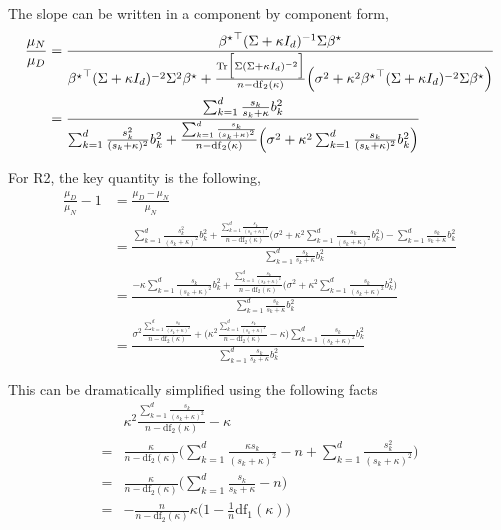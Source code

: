 The slope can be written in a component by component form,
\begin{align*}
\frac{\mu_{N}}{\mu_{D}} & =\frac{{{\beta^{\star}}}^{\top}(\Sigma+\kappa I_{d})^{-1}\Sigma{\beta^{\star}}}{{{\beta^{\star}}}^{\top}(\Sigma+\kappa I_{d})^{-2}\Sigma^{2}{\beta^{\star}}+\frac{\mathrm{Tr}\Big[\Sigma(\Sigma+\kappa I_{d})^{-2}\Big]}{n-\mathrm{df}_{2}(\kappa)}\Big(\sigma^{2}+\kappa^{2}{{\beta^{\star}}}^{\top}(\Sigma+\kappa I_{d})^{-2}\Sigma{\beta^{\star}}\Big)}\\
 & =\frac{\sum_{k=1}^{d}\frac{s_{k}}{s_{k}+\kappa}b_{k}^{2}}{\sum_{k=1}^{d}\frac{s_{k}^{2}}{(s_{k}+\kappa)^{2}}b_{k}^{2}+\frac{\sum_{k=1}^{d}\frac{s_{k}}{(s_{k}+\kappa)^{2}}}{n-\mathrm{df}_{2}(\kappa)}\Big(\sigma^{2}+\kappa^{2}\sum_{k=1}^{d}\frac{s_{k}}{(s_{k}+\kappa)^{2}}b_{k}^{2}\Big)}
\end{align*}

For R2, the key quantity is the following,
\begin{align*}
\frac{\mu_{D}}{\mu_{N}}-1 & =\frac{\mu_{D}-\mu_{N}}{\mu_{N}}\\
 & =\frac{\sum_{k=1}^{d}\frac{s_{k}^{2}}{(s_{k}+\kappa)^{2}}b_{k}^{2}+\frac{\sum_{k=1}^{d}\frac{s_{k}}{(s_{k}+\kappa)^{2}}}{n-\mathrm{df}_{2}(\kappa)}\Big(\sigma^{2}+\kappa^{2}\sum_{k=1}^{d}\frac{s_{k}}{(s_{k}+\kappa)^{2}}b_{k}^{2}\Big)-\sum_{k=1}^{d}\frac{s_{k}}{s_{k}+\kappa}b_{k}^{2}}{\sum_{k=1}^{d}\frac{s_{k}}{s_{k}+\kappa}b_{k}^{2}}\\
 & =\frac{-\kappa\sum_{k=1}^{d}\frac{s_{k}}{(s_{k}+\kappa)^{2}}b_{k}^{2}+\frac{\sum_{k=1}^{d}\frac{s_{k}}{(s_{k}+\kappa)^{2}}}{n-\mathrm{df}_{2}(\kappa)}\Big(\sigma^{2}+\kappa^{2}\sum_{k=1}^{d}\frac{s_{k}}{(s_{k}+\kappa)^{2}}b_{k}^{2}\Big)}{\sum_{k=1}^{d}\frac{s_{k}}{s_{k}+\kappa}b_{k}^{2}}\\
 & =\frac{\sigma^{2}\frac{\sum_{k=1}^{d}\frac{s_{k}}{(s_{k}+\kappa)^{2}}}{n-\mathrm{df}_{2}(\kappa)}+\Big(\kappa^{2}\frac{\sum_{k=1}^{d}\frac{s_{k}}{(s_{k}+\kappa)^{2}}}{n-\mathrm{df}_{2}(\kappa)}-\kappa\Big)\sum_{k=1}^{d}\frac{s_{k}}{(s_{k}+\kappa)^{2}}b_{k}^{2}}{\sum_{k=1}^{d}\frac{s_{k}}{s_{k}+\kappa}b_{k}^{2}}
\end{align*}

This can be dramatically simplified using the following facts
\begin{align*}
 & \kappa^{2}\frac{\sum_{k=1}^{d}\frac{s_{k}}{(s_{k}+\kappa)^{2}}}{n-\mathrm{df}_{2}(\kappa)}-\kappa\\
= & \frac{\kappa}{n-\mathrm{df}_{2}(\kappa)}\Big(\sum_{k=1}^{d}\frac{\kappa s_{k}}{(s_{k}+\kappa)^{2}}-n+\sum_{k=1}^{d}\frac{s_{k}^{2}}{(s_{k}+\kappa)^{2}}\Big)\\
= & \frac{\kappa}{n-\mathrm{df}_{2}(\kappa)}\Big(\sum_{k=1}^{d}\frac{s_{k}}{s_{k}+\kappa}-n\Big)\\
= & -\frac{n}{n-\mathrm{df}_{2}(\kappa)}\kappa\Big(1-\frac{1}{n}\mathrm{df}_{1}(\kappa)\Big)
\end{align*}

